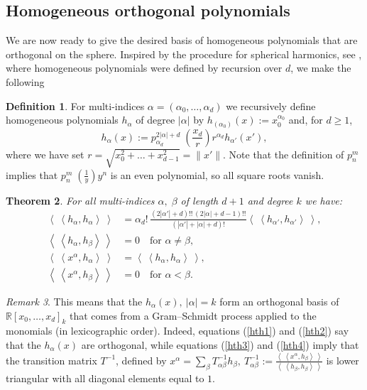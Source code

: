 \documentclass{amsart}
\newcommand{\p}[2]{p_{#1}^{#2}\;\!\!}
\newcommand{\coloneqq}{:=}
\newcommand{\bra}{\left<\!\!\!\:\left<}
\newcommand{\ket}{\right>\!\!\!\:\right>}
\newcommand{\R}{\mathbb{R}}
\theoremstyle{plain}
\newtheorem{theorem}{Theorem}[section]
\theoremstyle{definition}
\newtheorem{definition}[theorem]{Definition}
\theoremstyle{remark}
\newtheorem{remark}[theorem]{Remark}
\begin{document}
\subsection{Homogeneous orthogonal polynomials} \label{hsection}
We are now ready to give the desired basis of homogeneous polynomials that are orthogonal on the sphere. Inspired by the procedure for spherical harmonics, see \cite[p.~35]{Dunkl}, where homogeneous polynomials were defined by recursion over $d$, we make the following
\begin{definition} \label{hdef}
For multi-indices $\alpha=(\alpha_0,\ldots,\alpha_d)$ we recursively define homogeneous polynomials $h_\alpha$ of degree $|\alpha |$ by $h_{(\alpha_0)}(x) \coloneqq x_0^{\alpha_0}$ and, for $d\geq 1$,
$$
h_\alpha(x) \coloneqq \p{\alpha_d}{2|\alpha |+d}\left(\frac{x_d}{r}\right) r^{\alpha_d}h_{\alpha'}(x'),
$$
where we have set $r=\sqrt{x_0^2 +\ldots+x_{d-1}^2}=\|x'\|$. Note that the definition of $\p{n}{m}$ implies that $\p{n}{m}(\frac{1}{y})y^n$ is an even polynomial, so all square roots vanish.
\end{definition}
\begin{theorem}
For all multi-indices $\alpha,\;\beta$ of length $d+1$ and degree $k$ we have:
\begin{align} \label{hth1}
\bra h_\alpha ,h_\alpha \ket &= \alpha_d!\,\frac{\left(2|\alpha '|\!+\!d\right)!!\,\left(2|\alpha |\!+\!d\!-\!1\right)!!}{\left(|\alpha '|+|\alpha |+d\right)!}\bra h_{\alpha '},h_{\alpha '}\ket ,\\
\label{hth2}
\bra h_\alpha,h_\beta \ket &= 0 \quad\text{for }\alpha\neq\beta,\\
\label{hth3}
\bra x^\alpha, h_\alpha \ket &= \bra h_\alpha ,h_\alpha \ket ,\\
\label{hth4}
\bra x^\alpha,h_\beta \ket &= 0 \quad\text{for }\alpha < \beta.
\end{align}
\end{theorem}
\begin{remark}
This means that the $h_\alpha(x),\ |\alpha|=k$ form an orthogonal basis of $\R[x_0,\ldots,x_d]_k$ that comes from a Gram--Schmidt process applied to the monomials (in lexicographic order). Indeed, equations (\ref{hth1}) and (\ref{hth2}) say that the $h_\alpha(x)$ are orthogonal, while equations (\ref{hth3}) and (\ref{hth4}) imply that the transition matrix $T^{-1}$, defined by $ x^\alpha = \sum_\beta T^{-1}_{\alpha\beta}h_\beta,\ T^{-1}_{\alpha\beta} \coloneqq \frac{\bra x^\alpha,h_\beta\ket}{\bra h_\beta,h_\beta\ket} $ is lower triangular with all diagonal elements equal to $1$.
\end{remark}
\end{document}
